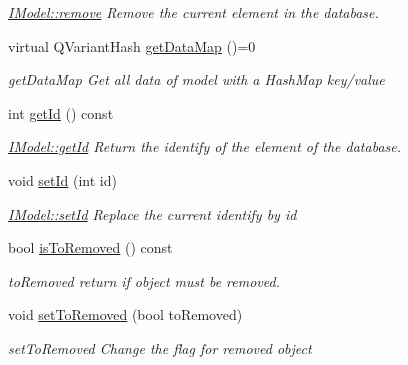 \begin{DoxyCompactItemize}
\begin{DoxyCompactList}\small\item\em \hyperlink{classModels_1_1IModel_a290473739e709321c818f4451e05e619}{I\-Model\-::remove} Remove the current element in the database. \end{DoxyCompactList}\item 
virtual Q\-Variant\-Hash \hyperlink{classModels_1_1IModel_a9851b0f296aac58353edff22af11cf3c}{get\-Data\-Map} ()=0
\begin{DoxyCompactList}\small\item\em get\-Data\-Map Get all data of model with a Hash\-Map key/value \end{DoxyCompactList}\item 
int \hyperlink{classModels_1_1IModel_a63087bb34da8c38a11109cd775122d31}{get\-Id} () const 
\begin{DoxyCompactList}\small\item\em \hyperlink{classModels_1_1IModel_a63087bb34da8c38a11109cd775122d31}{I\-Model\-::get\-Id} Return the identify of the element of the database. \end{DoxyCompactList}\item 
void \hyperlink{classModels_1_1IModel_ac99cb8ca4004755b1445fb5f66973341}{set\-Id} (int id)
\begin{DoxyCompactList}\small\item\em \hyperlink{classModels_1_1IModel_ac99cb8ca4004755b1445fb5f66973341}{I\-Model\-::set\-Id} Replace the current identify by {\itshape id} \end{DoxyCompactList}\item 
bool \hyperlink{classModels_1_1IModel_adecabe4161742cfc81ddbadc6706d9e9}{is\-To\-Removed} () const 
\begin{DoxyCompactList}\small\item\em to\-Removed return if object must be removed. \end{DoxyCompactList}\item 
void \hyperlink{classModels_1_1IModel_abfbfbc6c7de50ad4536027a964b2521c}{set\-To\-Removed} (bool to\-Removed)
\begin{DoxyCompactList}\small\item\em set\-To\-Removed Change the flag for removed object \end{DoxyCompactList}\end{DoxyCompactItemize}

